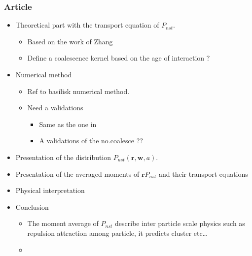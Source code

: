 \documentclass{sintefbeamer}
\begin{document}
\begin{frame}
  \frametitle{Article }
    \begin{itemize}
      \item Theoretical part with the transport equation of $P_{nst}$. 
      \begin{itemize}
        \item Based on the work of Zhang
        \item Define a coalescence kernel based on the age of interaction ?
      \end{itemize}
      \item Numerical method
      \begin{itemize}
        \item Ref to basilisk numerical method. 
        \item Need a validations 
        \begin{itemize}
          \item Same as the one in \citet{loisy2017buoyancy}
          \item A validations of the no.coalesce ??
        \end{itemize}
      \end{itemize}
      \item Presentation of the distribution $P_{nst} (\textbf{r},\textbf{w},a)$. 
      \item Presentation of the averaged moments of $\textbf{r}P_{nst}$ and their transport equations
      \item Physical interpretation 
      \item Conclusion 
      \begin{itemize}
        \item The moment average of $P_{nst}$ describe inter particle scale physics such as repulsion attraction among particle, it predicts cluster etc\ldots
        \item 
      \end{itemize}
    \end{itemize}

  

\end{frame}
\end{document}
